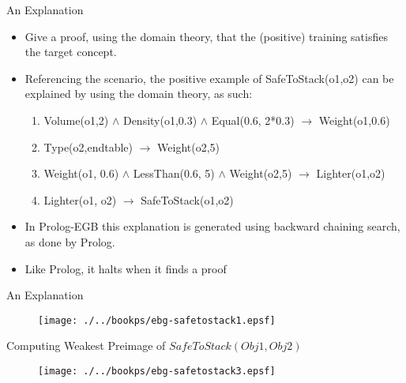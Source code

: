 \documentclass[%
pdf,
colorBG,
slideColor,
tcrico,
]{prosper}
\begin{document}
\begin{slide}{An Explanation }
\tiny
	\begin{itemize}
	 \item Give a proof, using the domain theory, that the (positive) training satisfies the target concept.
	\item Referencing the scenario, the positive example of SafeToStack(o1,o2) can be explained by using the domain theory, as such:
		\begin{enumerate}
		\item Volume(o1,2) $\wedge$ Density(o1,0.3) $\wedge$ Equal(0.6, 2*0.3) $\rightarrow$ Weight(o1,0.6)
		\item Type(o2,endtable) $\rightarrow$  Weight(o2,5)
		\item Weight(o1, 0.6) $\wedge$ LessThan(0.6, 5) $\wedge$ Weight(o2,5) $\rightarrow$  Lighter(o1,o2)
		\item Lighter(o1, o2) $\rightarrow$ SafeToStack(o1,o2) 
		\end{enumerate}
	\item In Prolog-EGB this explanation is generated using backward chaining search, as done by Prolog.
	\item Like Prolog, it halts when it finds a proof
	\end{itemize}
\end{slide}


\begin{slide}{An Explanation }
	\begin{figure}
		\centering
		\texttt{[image: ./../bookps/ebg-safetostack1.epsf]}
	\end{figure}
\end{slide}


\begin{slide}{Computing Weakest Preimage of $SafeToStack(Obj1, Obj2)$  }
	\begin{figure}
		\centering
		\texttt{[image: ./../bookps/ebg-safetostack3.epsf]}
	\end{figure}
\end{slide}

\end{document}
